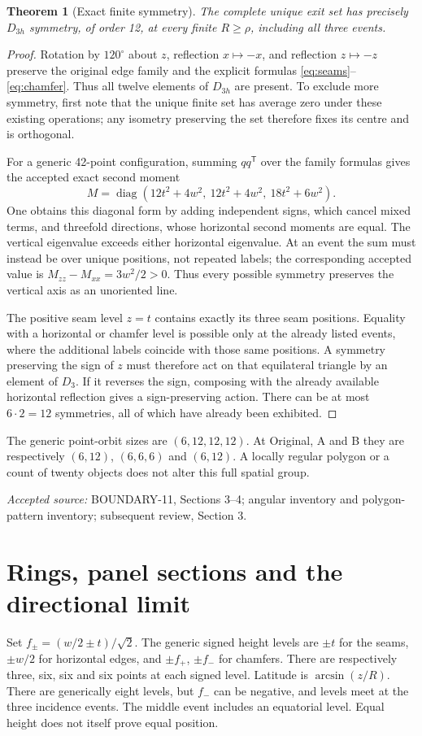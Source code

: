 \documentclass[11pt,a4paper]{article}
\newtheorem{theorem}{Theorem}[section]
\newcommand{\diag}{\operatorname{diag}}\newcommand{\Rot}{\operatorname{Rot}_z}
\newcommand{\source}[1]{\par{\small\emph{Accepted source:} #1}\par}
\begin{document}
\begin{theorem}[Exact finite symmetry]\label{thm:symmetry}
The complete unique exit set has precisely $D_{3h}$ symmetry, of order 12, at every finite $R\geq\rho$, including all three events.
\end{theorem}
\begin{proof}
Rotation by $120^\circ$ about $z$, reflection $x\mapsto-x$, and reflection $z\mapsto-z$ preserve the original edge family and the explicit formulas \eqref{eq:seams}--\eqref{eq:chamfer}. Thus all twelve elements of $D_{3h}$ are present. To exclude more symmetry, first note that the unique finite set has average zero under these existing operations; any isometry preserving the set therefore fixes its centre and is orthogonal.

For a generic 42-point configuration, summing $qq^{\mathsf T}$ over the family formulas gives the accepted exact second moment
\begin{equation}\label{eq:moment}
M=\diag(12t^2+4w^2,\ 12t^2+4w^2,\ 18t^2+6w^2).
\end{equation}
One obtains this diagonal form by adding independent signs, which cancel mixed terms, and threefold directions, whose horizontal second moments are equal. The vertical eigenvalue exceeds either horizontal eigenvalue. At an event the sum must instead be over unique positions, not repeated labels; the corresponding accepted value is $M_{zz}-M_{xx}=3w^2/2>0$. Thus every possible symmetry preserves the vertical axis as an unoriented line.

The positive seam level $z=t$ contains exactly its three seam positions. Equality with a horizontal or chamfer level is possible only at the already listed events, where the additional labels coincide with those same positions. A symmetry preserving the sign of $z$ must therefore act on that equilateral triangle by an element of $D_3$. If it reverses the sign, composing with the already available horizontal reflection gives a sign-preserving action. There can be at most $6\cdot2=12$ symmetries, all of which have already been exhibited.
\end{proof}
The generic point-orbit sizes are $(6,12,12,12)$. At Original, A and B they are respectively $(6,12)$, $(6,6,6)$ and $(6,12)$. A locally regular polygon or a count of twenty objects does not alter this full spatial group.
\source{BOUNDARY-11, Sections 3--4; angular inventory and polygon-pattern inventory; subsequent review, Section 3.}

\section{Rings, panel sections and the directional limit}\label{sec:sections}
Set $f_\pm=(w/2\pm t)/\sqrt2$. The generic signed height levels are $\pm t$ for the seams, $\pm w/2$ for horizontal edges, and $\pm f_+$, $\pm f_-$ for chamfers. There are respectively three, six, six and six points at each signed level. Latitude is $\arcsin(z/R)$. There are generically eight levels, but $f_-$ can be negative, and levels meet at the three incidence events. The middle event includes an equatorial level. Equal height does not itself prove equal position.
\end{document}
